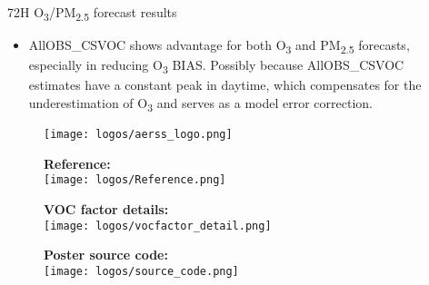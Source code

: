 \documentclass[final]{beamer}
\newlength{\sepwidth}
\newlength{\colwidth}
\newcommand{\separatorcolumn}{\begin{column}{\sepwidth}\end{column}}
\begin{document}
\begin{frame}[t]
\begin{columns}[t]
\begin{column}{\colwidth}
\begin{alertblock}{72H O\textsubscript{3}/PM\textsubscript{2.5} forecast results}
\begin{itemize}
                    \item AllOBS\_CSVOC shows advantage for both O\textsubscript{3} and PM\textsubscript{2.5} forecasts, especially in reducing O\textsubscript{3} BIAS. Possibly because AllOBS\_CSVOC estimates have a constant peak in daytime, which compensates for the underestimation of O\textsubscript{3} and serves as a model error correction.
                \end{itemize}
			\end{alertblock}
   
			\begin{block}{}
			    \begin{figure}
                   \begin{minipage}[c]{0.24\colwidth}
                       \texttt{[image: logos/aerss\_logo.png]}
                   \end{minipage}
                   \begin{minipage}[c]{0.24\colwidth}
                       \textbf{Reference: }\\
                       \texttt{[image: logos/Reference.png]}
                   \end{minipage}
                   \begin{minipage}[c]{0.24\colwidth}
                       \textbf{VOC factor details: }\\
                       \texttt{[image: logos/vocfactor\_detail.png]}
                   \end{minipage}
                   \begin{minipage}[c]{0.24\colwidth}
                       \textbf{Poster source code:}\\
                       \texttt{[image: logos/source\_code.png]}
                   \end{minipage}
                \end{figure}

			\end{block}
			
		\end{column}
		
		\separatorcolumn
	\end{columns}
\end{frame}
\end{document}

